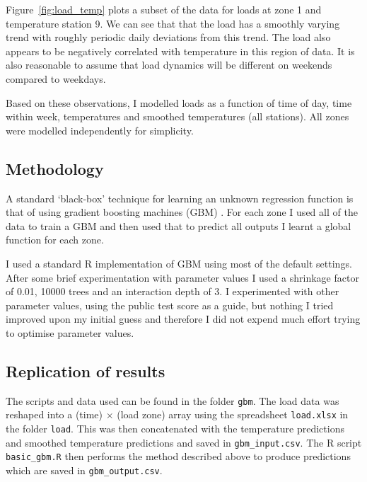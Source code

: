 \documentclass[final,authoryear,1p,times]{elsarticle}
\begin{document}
Figure~\ref{fig:load_temp} plots a subset of the data for loads at zone 1 and temperature station 9.
We can see that that the load has a smoothly varying trend with roughly periodic daily deviations from this trend.
The load also appears to be negatively correlated with temperature in this region of data.
It is also reasonable to assume that load dynamics will be different on weekends compared to weekdays.

Based on these observations, I modelled loads as a function of time of day, time within week, temperatures and smoothed temperatures (all stations).
All zones were modelled independently for simplicity.

\subsection{Methodology}

A standard `black-box' technique for learning an unknown regression function is that of using gradient boosting machines (GBM) \citep[e.g. chapter 10 of][]{Hastie2009}.
For each zone I used all of the data to train a GBM and then used that to predict all outputs \ie I learnt a global function for each zone.

I used a standard R implementation of GBM using most of the default settings\footnotemark.
After some brief experimentation with parameter values I used a shrinkage factor of 0.01, 10000 trees and an interaction depth of 3.
I experimented with other parameter values, using the public test score as a guide, but nothing I tried improved upon my initial guess and therefore I did not expend much effort trying to optimise parameter values.


\subsection{Replication of results}

The scripts and data used can be found in the folder \texttt{gbm}.
The load data was reshaped into a (time) $\times$ (load zone) array using the spreadsheet \texttt{load.xlsx} in the folder \texttt{load}.
This was then concatenated with the temperature predictions and smoothed temperature predictions and saved in \texttt{gbm\_input.csv}.
The R script \texttt{basic\_gbm.R} then performs the method described above to produce predictions which are saved in \texttt{gbm\_output.csv}.
\end{document}

